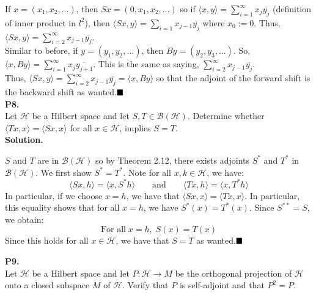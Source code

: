 \documentclass{article}
\begin{document}
    If $x = (x_1,x_2,\hdots)$, then $Sx = (0,x_1,x_2,\hdots)$ so if $\langle x,y\rangle = \sum_{i=1}^{\infty} x_j\overline{y_j}$
    (definition of inner product in $l^2$), then $\langle Sx,y\rangle = \sum_{i=1} x_{j-1}\overline{y_j}$ where $x_0 := 0$. Thus,
    $\langle Sx,y\rangle = \sum_{i=2}^{\infty} x_{j-1}\overline{y_j}$.\\

    Similar to before, if $y = (y_1,y_2,\hdots)$, then $By = (y_2,y_3,\hdots)$. So, $\langle x,By\rangle = 
    \sum_{i=1}^{\infty}x_j\overline{y_{j+1}}$. This is the same as saying, $\sum_{i=2}^{\infty} x_{j-1}\overline{y_j}$.\\

    Thus, $\langle Sx,y\rangle = \sum_{i=2}^{\infty} x_{j-1}\overline{y_j} = \langle x,By\rangle$ so that the adjoint of the forward
    shift is the backward shift as wanted.$\hfill\blacksquare$\\

    \textbf{P8.}\\

    Let $\mathcal{H}$ be a Hilbert space and let $S,T\in\mathcal{B}(\mathcal{H})$. Determine whether $\langle Tx,x\rangle 
    =\langle Sx,x\rangle$ for all $x\in\mathcal{H}$, implies $S = T$.\\

    \textbf{Solution.}

    $S$ and $T$ are in $\mathcal{B}(\mathcal{H})$ so by Theorem 2.12, there exists adjoints $S^*$ and $T^*$ in 
    $\mathcal{B}(\mathcal{H})$. We first show $S^* = T^*$. Note for all $x,k\in\mathcal{H}$, we have:
    \[ \langle Sx,h\rangle = \langle x,S^*h\rangle\qquad\text{and}\qquad\langle Tx,h\rangle = \langle x,T^*h\rangle \]
    In particular, if we choose $x=h$, we have that $\langle Sx,x\rangle = \langle Tx,x\rangle$. In particular, this equality
    shows that for all $x=h$, we have $S^*(x) = T^*(x)$. Since $S^{**} = S$, we obtain:
    \[ \text{For all}\;x=h,\;S(x) = T(x) \]
    Since this holds for all $x\in\mathcal{H}$, we have that $S = T$ as wanted.$\hfill\blacksquare$

    \newpage

    \textbf{P9.}\\

    Let $\mathcal{H}$ be a Hilbert space and let $P:\mathcal{H}\to M$ be the orthogonal projection of $\mathcal{H}$ onto a closed
    subspace $M$ of $\mathcal{H}$. Verify that $P$ is self-adjoint and that $P^2 = P$.\\
\end{document}
